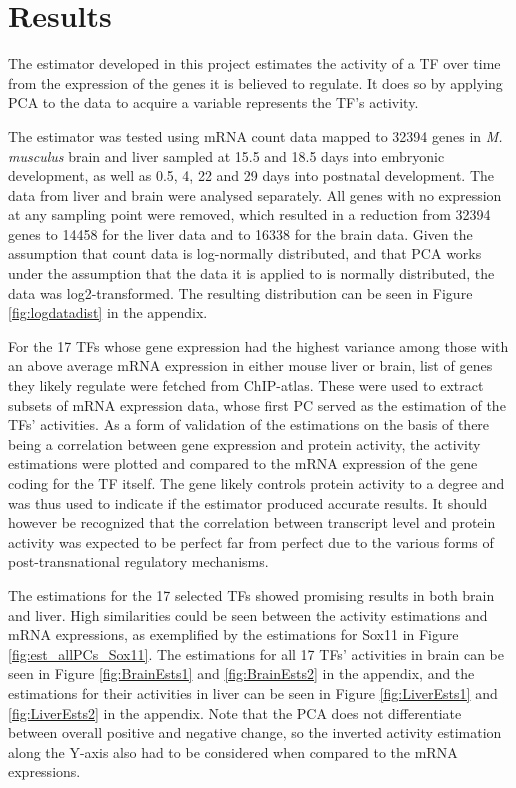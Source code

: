 \chapter{Results}
\vspace{-0.75cm}

The estimator developed in this project estimates the activity of a \ac{TF} over time from the expression of the genes it is believed to regulate. It does so by applying \ac{PCA} to the data to acquire a variable represents the \ac{TF}'s activity. 

The estimator was tested using mRNA count data mapped to 32394 genes in \textit{M. musculus} brain and liver sampled at 15.5 and 18.5 days into embryonic development, as well as 0.5, 4, 22 and 29 days into postnatal development. The data from liver and brain were analysed separately. All genes with no expression at any sampling point were removed, which resulted in a reduction from 32394 genes to 14458 for the liver data and to 16338 for the brain data. Given the assumption that count data is log-normally distributed, and that \ac{PCA} works under the assumption that the data it is applied to is normally distributed, the data was log2-transformed. The resulting distribution can be seen in Figure \ref{fig:logdatadist} in the appendix.

For the 17 \acp{TF} whose gene expression had the highest variance among those with an above average mRNA expression in either mouse liver or brain, list of genes they likely regulate were fetched from ChIP-atlas. These were used to extract subsets of mRNA expression data, whose first \ac{PC} served as the estimation of the \acp{TF}' activities. As a form of validation of the estimations on the basis of there being a correlation between gene expression and protein activity, the activity estimations were plotted and compared to the mRNA expression of the gene coding for the \ac{TF} itself. The gene likely controls protein activity to a degree and was thus used to indicate if the estimator produced accurate results. It should however be recognized that the correlation between transcript level and protein activity was expected to be perfect far from perfect due to the various forms of post-transnational regulatory mechanisms. 

The estimations for the 17 selected \acp{TF} showed promising results in both brain and liver. High similarities could be seen between the activity estimations and mRNA expressions, as exemplified by the estimations for Sox11 in Figure \ref{fig:est_allPCs_Sox11}. The estimations for all 17 \acp{TF}' activities in brain can be seen in Figure \ref{fig:BrainEsts1} and \ref{fig:BrainEsts2} in the appendix, and the estimations for their activities in liver can be seen in Figure \ref{fig:LiverEsts1} and \ref{fig:LiverEsts2} in the appendix. Note that the \ac{PCA} does not differentiate between overall positive and negative change, so the inverted activity estimation along the Y-axis also had to be considered when compared to the mRNA expressions.

